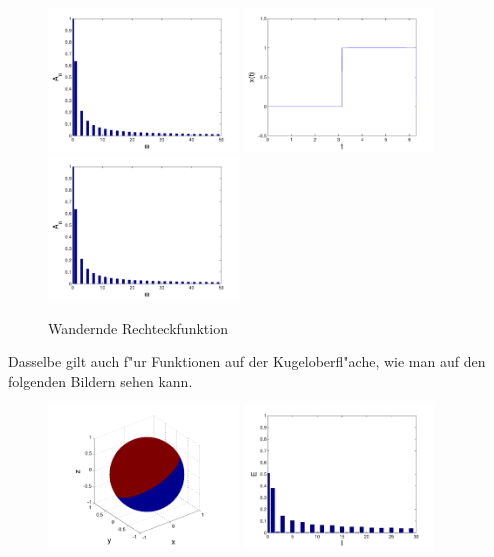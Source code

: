 \begin{refsection}
\begin{figure}
\includegraphics[width=0.45\textwidth]{kugel/kSpektrum/Rechteck3_2.pdf}
\includegraphics[width=0.45\textwidth]{kugel/kSpektrum/Rechteck4_1.pdf}
\includegraphics[width=0.45\textwidth]{kugel/kSpektrum/Rechteck4_2.pdf}
\caption{Wandernde Rechteckfunktion
\label{skript:Spektrum1}}
\end{figure}
Dasselbe gilt auch f"ur Funktionen auf der Kugeloberfl"ache, wie man
auf den folgenden Bildern sehen kann.
\begin{figure}
\centering
\includegraphics[width=0.45\textwidth]{kugel/kSpektrum/Kugel_1_1.pdf}
\includegraphics[width=0.45\textwidth]{kugel/kSpektrum/Kugel_1_2.pdf}

\end{figure}
\end{refsection}
